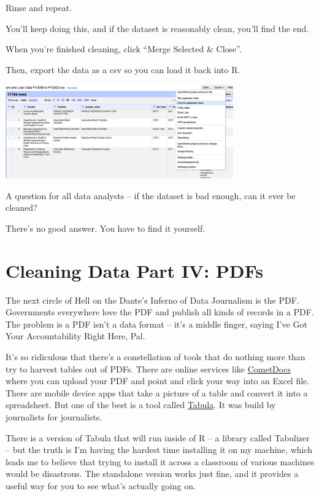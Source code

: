 \documentclass[
  letterpaper,
  DIV=11,
  numbers=noendperiod]{scrreprt}
\begin{document}
Rinse and repeat.

You'll keep doing this, and if the dataset is reasonably clean, you'll
find the end.

When you're finished cleaning, click ``Merge Selected \& Close''.

Then, export the data as a csv so you can load it back into R.

\includegraphics[width=3.86in,height=\textheight]{./images/open7.png}

A question for all data analysts -- if the dataset is bad enough, can it
ever be cleaned?

There's no good answer. You have to find it yourself.


\hypertarget{cleaning-data-part-iv-pdfs}{%
\chapter{Cleaning Data Part IV: PDFs}\label{cleaning-data-part-iv-pdfs}}

The next circle of Hell on the Dante's Inferno of Data Journalism is the
PDF. Governments everywhere love the PDF and publish all kinds of
records in a PDF. The problem is a PDF isn't a data format -- it's a
middle finger, saying I've Got Your Accountability Right Here, Pal.

It's so ridiculous that there's a constellation of tools that do nothing
more than try to harvest tables out of PDFs. There are online services
like \href{https://www.cometdocs.com/}{CometDocs} where you can upload
your PDF and point and click your way into an Excel file. There are
mobile device apps that take a picture of a table and convert it into a
spreadsheet. But one of the best is a tool called
\href{https://tabula.technology/}{Tabula}. It was build by journalists
for journalists.

There is a version of Tabula that will run inside of R -- a library
called Tabulizer -- but the truth is I'm having the hardest time
installing it on my machine, which leads me to believe that trying to
install it across a classroom of various machines would be disastrous.
The standalone version works just fine, and it provides a useful way for
you to see what's actually going on.
\end{document}
